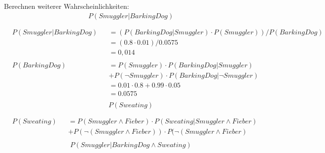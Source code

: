 \documentclass[ngerman]{fbi-aufgabenblatt}
\begin{document}
Berechnen weiterer Wahrscheinlichkeiten:
\begin{align*}
&P(Smuggler | BarkingDog)\\
&\\
\end{align*}
\begin{align*}
&P(Smuggler | BarkingDog) &&= (P(BarkingDog | Smuggler) \cdot P(Smuggler)) / P(BarkingDog) \\
& &&= (0.8 \cdot 0.01) / 0.0575\\
& &&= 0,014\\
&\\
&P(BarkingDog) &&= P(Smuggler) \cdot P(BarkingDog | Smuggler) \\
& &&   + P( \neg Smuggler) \cdot P(BarkingDog | \neg Smuggler) \\
& &&= 0.01 \cdot 0.8 + 0.99 \cdot 0.05 \\
& &&= 0.0575 \\
\end{align*}
\begin{align*}
&P(Sweating)\\
&\\
\end{align*}
\begin{align*}
&P(Sweating) &&= P(Smuggler \land Fieber) \cdot  P(Sweating | Smuggler \land Fieber)\\
& && + P(\neg(Smuggler \land Fieber)) \cdot  P(\neg(Smuggler \land Fieber)\\
\end{align*}
\begin{align*}
&P(Smuggler | BarkingDog \land Sweating)\\
&\\
\end{align*}
\end{document}
